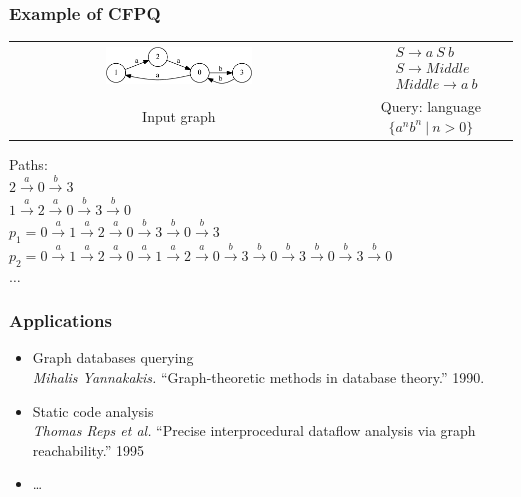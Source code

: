 \documentclass[xcolor=table]{beamer}
\begin{document}
\begin{frame} \frametitle{Example of CFPQ}

\begin{center}
  \begin{tabular}{  c  c  }
      \includegraphics[width=0.45\textwidth]{pictures/input.pdf}
      &
  $

  \begin{array}{rl}
     & S \rightarrow a \ S \ b \\
     & S \rightarrow Middle \\
     & Middle \rightarrow a \ b
  \end{array}

  $
  \\
  Input graph
  &
  Query: language $\{a^nb^n \ | \ n > 0 \}$

  \end{tabular}
\end{center}
\vspace{0.5cm}
Paths: \\
$2 \xrightarrow{a} 0 \xrightarrow{b} 3$ \\
$1 \xrightarrow{a} 2 \xrightarrow{a} 0 \xrightarrow{b} 3 \xrightarrow{b} 0$ \\
$p_1 = 0 \xrightarrow{a} 1 \xrightarrow{a} 2 \xrightarrow{a} 0 \xrightarrow{b} 3 \xrightarrow{b} 0 \xrightarrow{b} 3$ \\
$p_2 = 0 \xrightarrow{a} 1 \xrightarrow{a} 2 \xrightarrow{a} 0 \xrightarrow{a} 1 \xrightarrow{a} 2 \xrightarrow{a} 0 \xrightarrow{b} 3 \xrightarrow{b} 0 \xrightarrow{b} 3 \xrightarrow{b} 0 \xrightarrow{b} 3 \xrightarrow{b} 0$ \\
$\dots$

\end{frame}


\begin{frame} \frametitle{Applications}
\begin{itemize}
\item Graph databases querying \\
\emph{Mihalis Yannakakis.} ``Graph-theoretic methods in database theory.'' 1990.
\item Static code analysis \\
\emph{Thomas Reps et al.} ``Precise interprocedural dataflow analysis via graph reachability.'' 1995
\item \dots
\end{itemize}
\end{frame}
\end{document}

